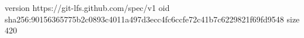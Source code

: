 version https://git-lfs.github.com/spec/v1
oid sha256:90156365775b2c0893c4011a497d3ecc4fc6ccfe72c41b7c6229821f69fd9548
size 420
